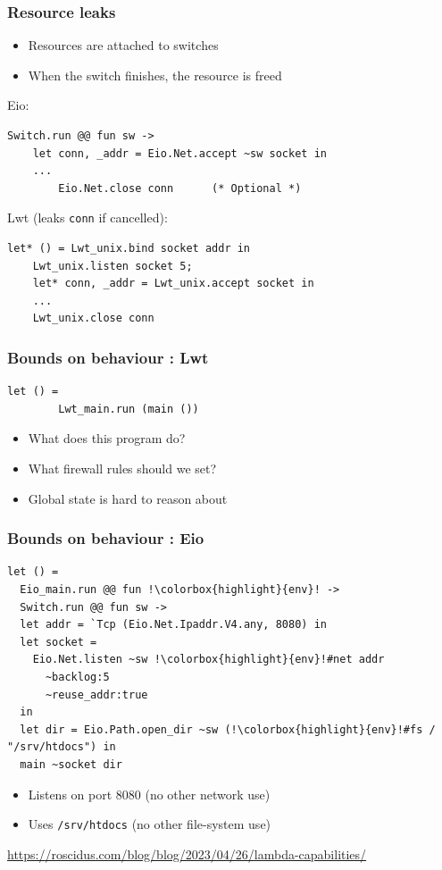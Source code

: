 \documentclass{beamer}
\begin{document}
\begin{frame}[fragile]
	\frametitle{Resource leaks}
	\begin{itemize}
		\item Resources are attached to switches
		\item When the switch finishes, the resource is freed
	\end{itemize}
	Eio:
	\begin{lstlisting}[style=ocaml]
	Switch.run @@ fun sw ->
	let conn, _addr = Eio.Net.accept ~sw socket in
	...
        Eio.Net.close conn      (* Optional *)
	\end{lstlisting}
        Lwt (leaks \verb|conn| if cancelled):
	\begin{lstlisting}[style=ocaml]
	let* () = Lwt_unix.bind socket addr in
	Lwt_unix.listen socket 5;
	let* conn, _addr = Lwt_unix.accept socket in
	...
	Lwt_unix.close conn
	\end{lstlisting}
\end{frame}

\begin{frame}[fragile]
	\frametitle{Bounds on behaviour : Lwt}

	\begin{lstlisting}[style=ocaml]
	      let () =
		Lwt_main.run (main ())
	\end{lstlisting}

	\begin{itemize}
		\item What does this program do?
		\item What firewall rules should we set?
		\item Global state is hard to reason about
	\end{itemize}
\end{frame}

\begin{frame}[fragile]
	\frametitle{Bounds on behaviour : Eio}

	\setlength\fboxsep{1.2pt}
	\begin{lstlisting}[style=ocaml,escapechar=!]
let () =
  Eio_main.run @@ fun !\colorbox{highlight}{env}! ->
  Switch.run @@ fun sw ->
  let addr = `Tcp (Eio.Net.Ipaddr.V4.any, 8080) in
  let socket =
    Eio.Net.listen ~sw !\colorbox{highlight}{env}!#net addr
      ~backlog:5
      ~reuse_addr:true
  in
  let dir = Eio.Path.open_dir ~sw (!\colorbox{highlight}{env}!#fs / "/srv/htdocs") in
  main ~socket dir
	\end{lstlisting}
	\begin{itemize}
                \item Listens on port 8080 (no other network use)
                \item Uses \verb|/srv/htdocs| (no other file-system use)
	\end{itemize}
	\bigskip
	\url{https://roscidus.com/blog/blog/2023/04/26/lambda-capabilities/}
\end{frame}
\end{document}
